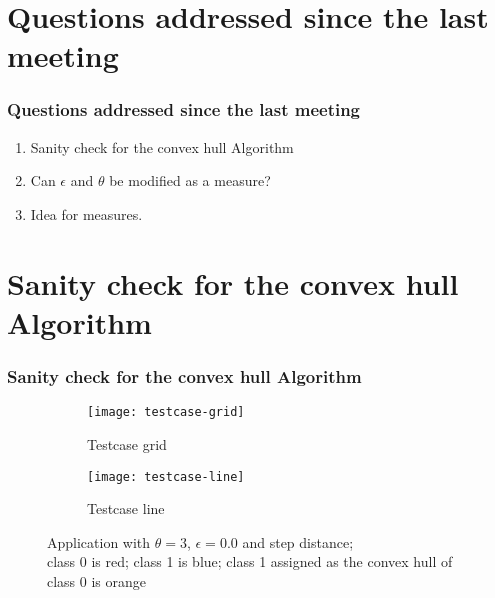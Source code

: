 \documentclass[
    11pt, %
    aspectratio=169, %
    handout
]{beamer}
\begin{document}
\section{Questions addressed since the last meeting}
\begin{frame}
\frametitle{Questions addressed since the last meeting}
\begin{enumerate}
\item<1-> Sanity check for the convex hull Algorithm
\item<2-> Can $\epsilon$ and $\theta$ be modified as a measure?
\item<3-> Idea for measures.
\end{enumerate}
\end{frame}

\section{Sanity check for the convex hull Algorithm}
\begin{frame}
\frametitle{Sanity check for the convex hull Algorithm}
\begin{figure}
\centering
\begin{subfigure}{0.3\textwidth}
    \texttt{[image: testcase-grid]}
    \caption{Testcase grid}
    \label{fig:first}
\end{subfigure}
\hfill
\begin{subfigure}{0.3\textwidth}
    \texttt{[image: testcase-line]}
    \caption{Testcase line}
    \label{fig:second}
\end{subfigure}
\caption{Application with $\theta=3$, $\epsilon=0.0$ and step distance; \\ class 0 is red; class 1 is blue; class 1 assigned as the convex hull of class 0 is orange}
\end{figure}
\end{frame}
\end{document}
